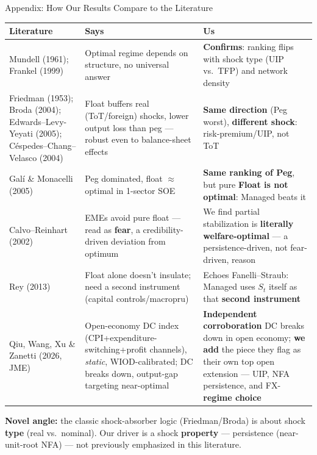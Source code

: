 \begin{frame}{Appendix: How Our Results Compare to the Literature}

{\tiny
\renewcommand{\arraystretch}{1.05}
\begin{tabular}{@{}p{2.8cm}p{3.55cm}p{3.55cm}@{}}
\toprule
\textbf{Literature} & \textbf{Says} & \textbf{Us} \\
\midrule
Mundell (1961); Frankel (1999) & Optimal regime depends on structure, no universal answer & \textbf{Confirms}: ranking flips with shock type (UIP vs.\ TFP) and network density \\[1pt]
Friedman (1953); Broda (2004); Edwards--Levy-Yeyati (2005); Céspedes--Chang--Velasco (2004) & Float buffers real (ToT/foreign) shocks, lower output loss than peg --- robust even to balance-sheet effects & \textbf{Same direction} (Peg worst), \textbf{different shock}: risk-premium/UIP, not ToT \\[1pt]
Gal\'i \& Monacelli (2005) & Peg dominated, float $\approx$ optimal in 1-sector SOE & \textbf{Same ranking of Peg}, but pure \textbf{Float is not optimal}: Managed beats it \\[1pt]
Calvo--Reinhart (2002) & EMEs avoid pure float --- read as \textbf{fear}, a credibility-driven deviation from optimum & We find partial stabilization is \textbf{literally welfare-optimal} --- a persistence-driven, not fear-driven, reason \\[1pt]
Rey (2013) & Float alone doesn't insulate; need a second instrument (capital controls/macropru) & Echoes Fanelli--Straub: Managed uses $S_t$ itself as that \textbf{second instrument} \\[1pt]
Qiu, Wang, Xu \& Zanetti (2026, JME) & Open-economy DC index (CPI+expenditure-switching+profit channels), \emph{static}, WIOD-calibrated; DC breaks down, output-gap targeting near-optimal & \textbf{Independent corroboration} DC breaks down in open economy; \textbf{we add} the piece they flag as their own top open extension --- UIP, NFA persistence, and FX-\textbf{regime choice} \\
\bottomrule
\end{tabular}}

\vspace{4pt}
{\scriptsize \textbf{Novel angle:} the classic shock-absorber logic (Friedman/Broda) is about shock \textbf{type} (real vs.\ nominal). Our driver is a shock \textbf{property} --- persistence (near-unit-root NFA) --- not previously emphasized in this literature.}

\end{frame}

